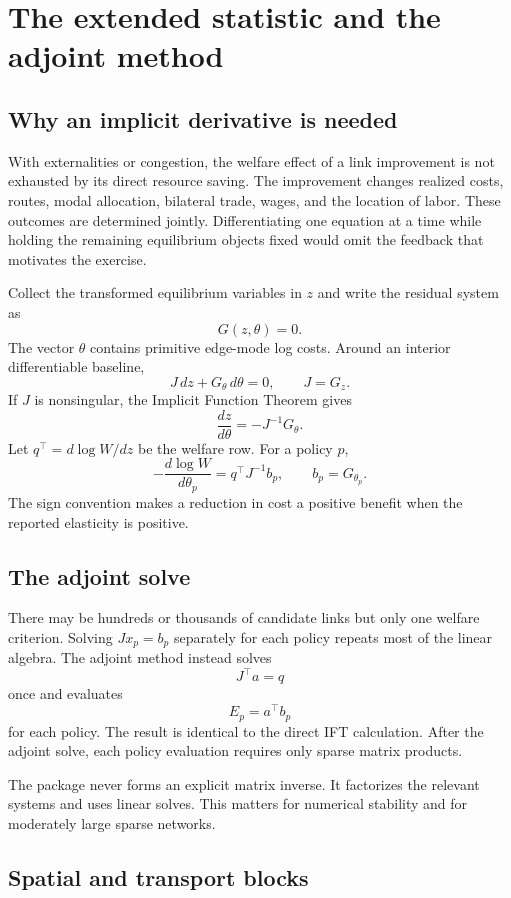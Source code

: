 \chapter{The extended statistic and the adjoint method}
\label{ch:ift}

\section{Why an implicit derivative is needed}

With externalities or congestion, the welfare effect of a link improvement is
not exhausted by its direct resource saving. The improvement changes realized
costs, routes, modal allocation, bilateral trade, wages, and the location of
labor. These outcomes are determined jointly. Differentiating one equation at
a time while holding the remaining equilibrium objects fixed would omit the
feedback that motivates the exercise.

Collect the transformed equilibrium variables in \(z\) and write the residual
system as
\[
  G(z,\theta)=0.
\]
The vector \(\theta\) contains primitive edge-mode log costs. Around an
interior differentiable baseline,
\[
 J\,dz+G_\theta\,d\theta=0,
 \qquad
 J=G_z.
\]
If \(J\) is nonsingular, the Implicit Function Theorem gives
\[
 \frac{dz}{d\theta}=-J^{-1}G_\theta.
\]
Let \(q^\top=d\log W/dz\) be the welfare row. For a policy \(p\),
\[
 -\frac{d\log W}{d\theta_p}
 =q^\top J^{-1}b_p,
 \qquad b_p=G_{\theta_p}.
\]
The sign convention makes a reduction in cost a positive benefit when the
reported elasticity is positive.

\section{The adjoint solve}

There may be hundreds or thousands of candidate links but only one welfare
criterion. Solving \(Jx_p=b_p\) separately for each policy repeats most of the
linear algebra. The adjoint method instead solves
\[
 J^\top a=q
\]
once and evaluates
\[
 E_p=a^\top b_p
\]
for each policy. The result is identical to the direct IFT calculation. After
the adjoint solve, each policy evaluation requires only sparse matrix products.

The package never forms an explicit matrix inverse. It factorizes the relevant
systems and uses linear solves. This matters for numerical stability and for
moderately large sparse networks.

\section{Spatial and transport blocks}

